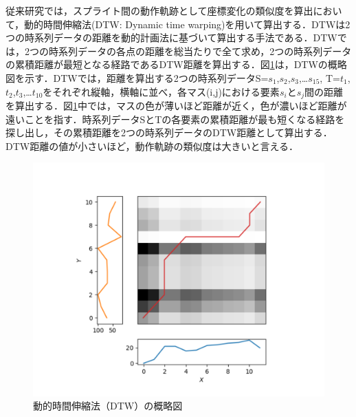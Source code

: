 \documentclass[T,J]{fose} %
\begin{document}
従来研究では，スプライト間の動作軌跡として座標変化の類似度を算出において，動的時間伸縮法(DTW: Dynamic time warping)を用いて算出する．DTWは2つの時系列データの距離を動的計画法に基づいて算出する手法である．DTWでは，2つの時系列データの各点の距離を総当たりで全て求め，2つの時系列データの累積距離が最短となる経路であるDTW距離を算出する．図\ref{fig:dtw}は，DTWの概略図を示す．DTWでは，距離を算出する2つの時系列データS=$s_{1}$,$s_{2}$,$s_{3}$,…$s_{15}$, T=$t_{1}$,$t_{2}$,$t_{3}$,…$t_{10}$をそれぞれ縦軸，横軸に並べ，各マス(i,j)における要素$s_{i}$と$s_{j}$間の距離を算出する．図\ref{fig:dtw}中では，マスの色が薄いほど距離が近く，色が濃いほど距離が遠いことを指す．時系列データSとTの各要素の累積距離が最も短くなる経路を探し出し，その累積距離を2つの時系列データのDTW距離として算出する．DTW距離の値が小さいほど，動作軌跡の類似度は大きいと言える．
\begin{figure}[t]
	\centering
	\includegraphics[width=1.0\linewidth]{Okamoto_fig/dtw-example.pdf}
	\caption{動的時間伸縮法（DTW）の概略図}
	\label{fig:dtw}
\end{figure}
\end{document}
